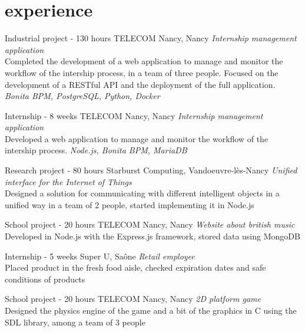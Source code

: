 \documentclass[]{lemaki-cv}
\begin{document}

		\section{experience}

		\begin{entrylist}


			{Industrial project {\normalfont{}- 130 hours}}
			{TELECOM Nancy, Nancy}
			{\emph{Internship management application} \\
			Completed the development of a web application to manage and monitor
			the workflow of the intership process, in a team of three people.
			Focused on the development of a RESTful API and the deployment of
			the full application. \emph{Bonita BPM, PostgreSQL, Python, Docker}}


			{Internship {\normalfont{}- 8 weeks}}
			{TELECOM Nancy, Nancy}
			{\emph{Internship management application} \\
			Developed a web application to manage and monitor the workflow of
			the intership process. \emph{Node.js, Bonita BPM, MariaDB}}


			{Research project {\normalfont{}- 80 hours}}
			{Starburst Computing, Vandoeuvre-lès-Nancy}
			{\emph{Unified interface for the Internet of Things} \\
			Designed a solution for communicating with different intelligent
			objects in a unified way in a team of 2 people, started implementing
			it in Node.js}


			{School project {\normalfont{}- 20 hours}}
			{TELECOM Nancy, Nancy}
			{\emph{Website about british music} \\
			Developed in Node.js with the Express.js framework, stored data
			using MongoDB}


			{Internship {\normalfont{}- 5 weeks}}
			{Super U, Saône}
			{\emph{Retail employee} \\
			Placed product in the fresh food aisle, checked expiration dates and
			safe conditions of products}


			{School project {\normalfont{}- 20 hours}}
			{TELECOM Nancy, Nancy}
			{\emph{2D platform game} \\
			Designed the physics engine of the game and a bit of the graphics in
			C using the SDL library, among a team of 3 people}


		\end{entrylist}
	
\end{document}
